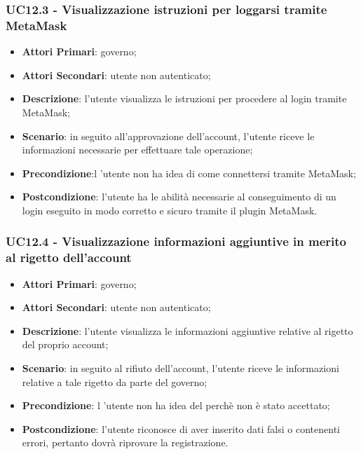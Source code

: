\subsubsection{UC12.3 - Visualizzazione istruzioni per loggarsi tramite MetaMask\glosp}
\begin{itemize}
	\item \textbf{Attori Primari}:
	governo;
	\item \textbf{Attori Secondari}:
	utente non autenticato;
	\item \textbf{Descrizione}: l'utente visualizza le istruzioni per procedere al login tramite MetaMask\glosp;
	\item \textbf{Scenario}: in seguito all'approvazione dell'account, l'utente riceve le informazioni necessarie per effettuare tale operazione;
	\item \textbf{Precondizione}:l 'utente non ha idea di come connettersi tramite MetaMask\glosp;
	\item \textbf{Postcondizione}: l'utente ha le abilità necessarie al conseguimento di un login eseguito in modo corretto e sicuro tramite il plugin MetaMask\glosp.
\end{itemize}
\subsubsection{UC12.4 - Visualizzazione informazioni aggiuntive in merito al rigetto dell'account}
\begin{itemize}
	\item \textbf{Attori Primari}:
	governo;
	\item \textbf{Attori Secondari}:
	utente non autenticato;
	\item \textbf{Descrizione}: l'utente visualizza le informazioni aggiuntive relative al rigetto del proprio account;
	\item \textbf{Scenario}: in seguito al rifiuto dell'account, l'utente riceve le informazioni relative a tale rigetto da parte del governo;
	\item \textbf{Precondizione}: l 'utente non ha idea del perchè non è stato accettato;
	\item \textbf{Postcondizione}: l'utente riconosce di aver inserito dati falsi o contenenti errori, pertanto dovrà riprovare la registrazione.
\end{itemize} 
